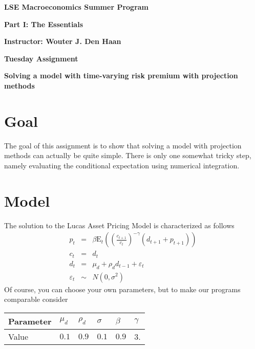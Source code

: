 \documentclass{article}
\begin{document}
\begin{center}
\textbf{LSE Macroeconomics Summer Program}

\textbf{Part I: The Essentials}

\textbf{Instructor: Wouter J. Den Haan\bigskip }

\textbf{Tuesday Assignment}

\textbf{Solving a model with time-varying risk premium with projection
methods\bigskip }
\end{center}

\section{Goal}

The goal of this assignment is to show that solving a model with projection
methods can actually be quite simple. There is only one somewhat tricky
step, namely evaluating the conditional expectation using numerical
integration.

\section{Model}

The solution to the Lucas Asset Pricing Model is characterized as follows%
\begin{eqnarray*}
p_{t} &=&\beta \text{E}_{t}\left( \left( \frac{c_{t+1}}{c_{t}}\right)
^{-\gamma }\left( d_{t+1}+p_{t+1}\right) \right) \\
c_{t} &=&d_{t} \\
d_{t} &=&\mu _{d}+\rho _{d}d_{t-1}+\varepsilon _{t} \\
\varepsilon _{t} &\sim &N\left( 0,\sigma ^{2}\right)
\end{eqnarray*}%
Of course, you can choose your own parameters, but to make our programs
comparable consider\newline
\begin{center}%
\begin{tabular}{l|lllll}
Parameter & $\mu _{d}$ & $\rho _{d}$ & $\sigma $ & $\beta $ & $\gamma $ \\ 
\hline
Value & $0.1$ & $0.9$ & $0.1$ & $0.9$ & $3$.%
\end{tabular}%
\end{center}%
\end{document}
